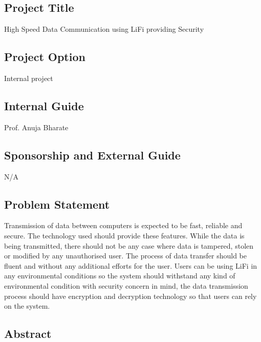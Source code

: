 \documentclass[12pt,a4paper]
{article}
\numberwithin{table}{section}
\begin{document}
 {\setlength{\baselineskip}{1.0\baselineskip} 		
  \vspace{0.1in}	
 
 


\vspace{0.1 in}
\subsection{Project Title}
\vspace{0.1 in}
High Speed Data Communication using LiFi providing Security

\subsection{Project Option }
\vspace{0.1 in}
 Internal project

\subsection{Internal Guide}
\vspace{0.1 in}
Prof. Anuja Bharate


\subsection{Sponsorship and External Guide} 
\vspace{0.1 in}
N/A

\subsection{Problem Statement}
\label{sec:problem}
    \hspace{0.7 in}   Transmission of data between computers is expected to be fast, reliable and secure. The technology used should provide these features. While the data is being transmitted, there should not be any case where data is tampered, stolen or modified by any unauthorised user. The process of data transfer should be fluent and without any additional efforts for the user. Users can be using LiFi in any environmental conditions so the system should withstand any kind of environmental condition with security concern in mind, the data transmission process should have encryption and decryption technology so that users can rely on the system.
\\
\newpage
\subsection{Abstract}

}
\end{document}
